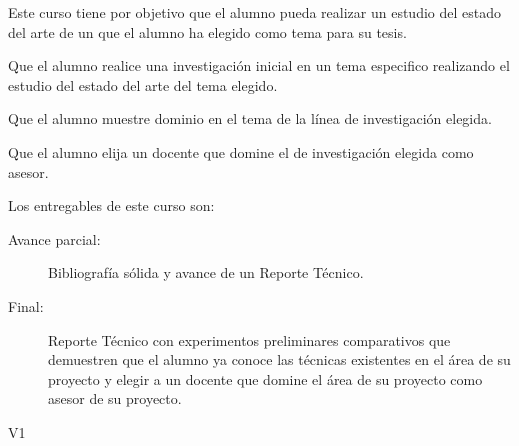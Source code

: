 \begin{syllabus}


\begin{justification}
Este curso tiene por objetivo que el alumno pueda realizar un estudio del estado del arte de un que el alumno ha elegido como tema para su tesis.
\end{justification}

\begin{goals}
\item Que el alumno realice una investigación inicial en un tema especifico realizando el estudio del estado del arte del tema elegido.
\item Que el alumno muestre dominio en el tema de la línea de investigación elegida.
\item Que el alumno elija un docente que domine el de investigación elegida como asesor. 
\item Los entregables de este curso son:
	\begin{description}
		\item [Avance parcial:] Bibliografía sólida y avance de un Reporte Técnico.
		\item [Final:] Reporte Técnico con experimentos preliminares comparativos que demuestren que el alumno ya conoce las técnicas existentes en el área de su proyecto y elegir a un docente que domine el área de su proyecto como asesor de su proyecto.
	\end{description}
\end{goals}

\begin{outcomes}{V1}
    \item {}
    \item {}
    \item {}
    \item {}
    \item {}
    \item {}
    \item {}
    \item {}
    \item {}
    \item {}
    \item {}
\end{outcomes}


\end{syllabus}
